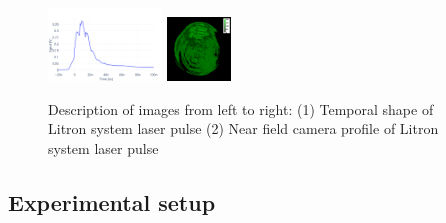         \begin{figure}[h]
        \begin{center}

        \includegraphics[width=0.27\textwidth]{img/temporal_profile_new.png}
        \label{fig:profile}
        \includegraphics[width=0.15\textwidth]{img/C2-v3_36_mJ_scale.png}
        \label{fig:profile}

        \caption{Description of images from left to right: (1) Temporal shape of Litron system laser pulse (2) Near field camera profile of Litron system laser pulse}
        \label{fig:profile}
        \end{center}

        \end{figure}
    



\subsection{Experimental setup}

